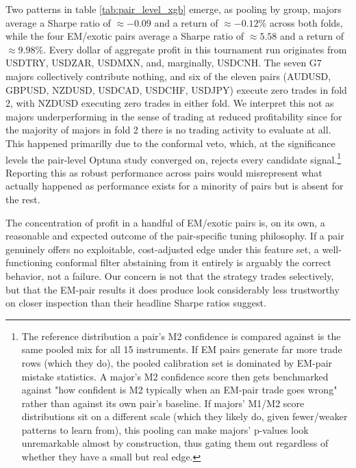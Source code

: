 \documentclass[12pt, a4paper]{article}
\begin{document}
Two patterns in table \ref{tab:pair_level_xgb} emerge, as pooling by group, majors average a Sharpe ratio of $\approx -0.09$ and a return of $\approx -0.12\%$ across both folds, 
while the four EM/exotic pairs average a Sharpe ratio of $\approx 5.58$ and a return of $\approx 9.98\%$. Every dollar of aggregate profit in this tournament run originates from 
USDTRY, USDZAR, USDMXN, and, marginally, USDCNH. The seven G7 majors collectively contribute nothing, and six of the eleven pairs (AUDUSD, GBPUSD, NZDUSD, USDCAD, USDCHF, USDJPY) 
execute zero trades in fold 2, with NZDUSD executing zero trades in either fold. We interpret this not as majors underperforming in the sense of trading at reduced profitability 
since for the majority of majors in fold 2 there is no trading activity to evaluate at all. This happened primarilly due to the conformal veto, which, at the significance levels 
the pair-level Optuna study converged on, rejects every candidate signal.\footnote{The reference distribution a pair's M2 confidence is compared against is the same pooled mix for 
all 15 instruments. If EM pairs generate far more trade rows (which they do), the pooled calibration set is dominated by EM-pair mistake statistics. A major's M2 confidence score 
then gets benchmarked against "how confident is M2 typically when an EM-pair trade goes wrong" rather than against its own pair's baseline. 
If majors' M1/M2 score distributions sit on a different scale (which they likely do, given fewer/weaker patterns to learn from), this pooling can make majors' p-values look 
unremarkable almost by construction, thus gating them out regardless of whether they have a small but real edge.} 
Reporting this as robust performance across pairs would misrepresent what actually happened as performance exists for a minority of pairs but is absent for the rest.

\medskip

The concentration of profit in a handful of EM/exotic pairs is, on its own, a reasonable and expected outcome of the pair-specific tuning philosophy. If a pair genuinely offers 
no exploitable, cost-adjusted edge under this feature set, a well-functioning conformal filter abstaining from it entirely is arguably the correct behavior, not a failure. Our 
concern is not that the strategy trades selectively, but that the EM-pair results it does produce look considerably less trustworthy on closer inspection than their headline 
Sharpe ratios suggest.
\end{document}
